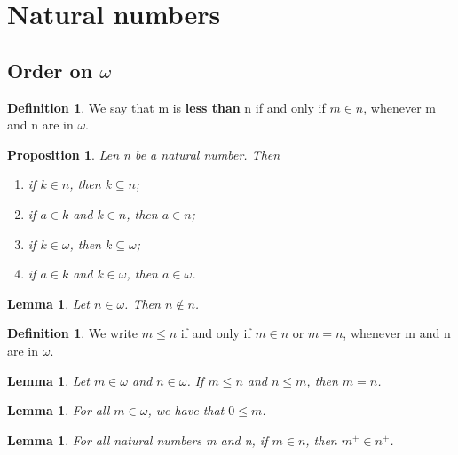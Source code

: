\documentclass{article}
\numberwithin{thm}{subsection}
\newtheorem{lem}[thm]{Lemma}
\newtheorem{prop}[thm]{Proposition}
\theoremstyle{definition}
\newtheorem{mydef}[thm]{Definition}
\begin{document}
\setcounter{section}{3}
\section{Natural numbers}

\setcounter{subsection}{3}
\subsection{Order on $\omega$}

\begin{mydef}
	We say that  m is \textbf{less than} n if and only if $m \in n$, whenever m and n are in $\omega$.
\end{mydef}

\begin{prop}
	Len n be a natural number. Then
	\begin{enumerate}[label=(\arabic*)]
		\item if $k \in n$, then $k \subseteq n$;
		\item if $a \in k$ and $k \in n$, then $a \in n$;
		\item if $k \in \omega$, then $k \subseteq \omega$;
		\item if $a \in k$ and $k \in \omega$, then $a \in \omega$.
	\end{enumerate}
\end{prop}

\begin{lem}
	Let $n \in \omega$. Then $n \notin n$.
\end{lem}

\begin{mydef}
	We write $m \leq n$ if and only if $m \in n$ or $m = n$, whenever m and n are in $\omega$.
\end{mydef}

\begin{lem}
	Let $m \in \omega$ and $n \in \omega$. If $m \leq n$ and $n \leq m$, then $m = n$.
\end{lem}

\begin{lem}
	For all $m \in \omega$, we have that $0 \leq m$.
\end{lem}

\begin{lem}
	For all natural numbers m and n, if $m \in n$, then $m^+ \in n^+$.
\end{lem}
\end{document}
